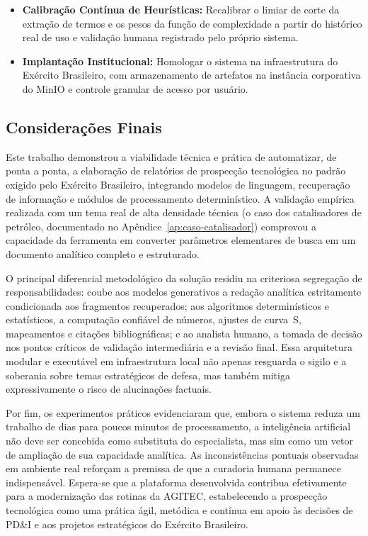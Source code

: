 \documentclass[12pt, a4paper]{article}
\begin{document}
\begin{itemize}
    \item \textbf{Calibração Contínua de Heurísticas:} Recalibrar o limiar de corte da extração de termos e os pesos da função de complexidade a partir do histórico real de uso e validação humana registrado pelo próprio sistema.

    \item \textbf{Implantação Institucional:} Homologar o sistema na infraestrutura do Exército Brasileiro, com armazenamento de artefatos na instância corporativa do MinIO e controle granular de acesso por usuário.
  \end{itemize}

  \subsection{Considerações Finais}

  Este trabalho demonstrou a viabilidade técnica e prática de automatizar, de ponta a ponta, a elaboração de relatórios de prospecção tecnológica no padrão exigido pelo Exército Brasileiro, integrando modelos de linguagem, recuperação de informação e módulos de processamento determinístico. A validação empírica realizada com um tema real de alta densidade técnica (o caso dos catalisadores de petróleo, documentado no Apêndice~\ref{ap:caso-catalisador}) comprovou a capacidade da ferramenta em converter parâmetros elementares de busca em um documento analítico completo e estruturado.

  O principal diferencial metodológico da solução residiu na criteriosa segregação de responsabilidades: coube aos modelos generativos a redação analítica estritamente condicionada aos fragmentos recuperados; aos algoritmos determinísticos e estatísticos, a computação confiável de números, ajustes de curva~S, mapeamentos e citações bibliográficas; e ao analista humano, a tomada de decisão nos pontos críticos de validação intermediária e a revisão final. Essa arquitetura modular e executável em infraestrutura local não apenas resguarda o sigilo e a soberania sobre temas estratégicos de defesa, mas também mitiga expressivamente o risco de alucinações factuais.

  Por fim, os experimentos práticos evidenciaram que, embora o sistema reduza um trabalho de dias para poucos minutos de processamento, a inteligência artificial não deve ser concebida como substituta do especialista, mas sim como um vetor de ampliação de sua capacidade analítica. As inconsistências pontuais observadas em ambiente real reforçam a premissa de que a curadoria humana permanece indispensável. Espera-se que a plataforma desenvolvida contribua efetivamente para a modernização das rotinas da AGITEC, estabelecendo a prospecção tecnológica como uma prática ágil, metódica e contínua em apoio às decisões de PD\&I e aos projetos estratégicos do Exército Brasileiro.
\end{document}
